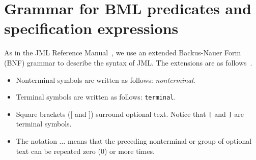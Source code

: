 \section{Grammar for BML predicates and specification expressions}\label{AppBML}\InsertLabelMaybe

As in the JML Reference Manual~\cite{JMLReferenceManual05}, we use an extended Backus-Nauer Form (BNF) grammar to describe the syntax of JML. The extensions are as follows~\cite{Ledgard80}.

\begin{itemize}
\item Nonterminal symbols are written as follows: \textit{nonterminal}.

\item Terminal symbols are written as follows: \texttt{terminal}.

\item Square brackets ([ and ]) surround optional text. Notice that
\texttt{[} and \texttt{]} are terminal symbols.  

\item The notation \(\ldots\) means that the preceding nonterminal or group of optional text can be repeated zero (0) or more times.  
\end{itemize}

